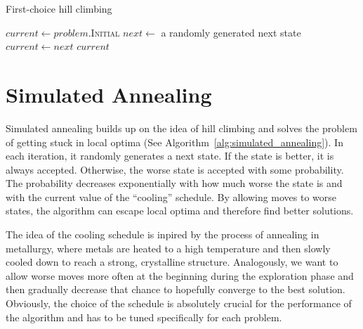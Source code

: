 
\begin{algorithm}

\begin{algorithmic}
\caption{First-choice hill climbing} \label{alg:first_choice_hill_climbing}
\State $current \gets problem$.I\textsc{nitial}
    \State $next \gets$ a randomly generated next state
        \State $current \gets next$
    \EndIf
\EndFor
\State \Return $current$
\EndFunction
\end{algorithmic}
\end{algorithm}

\section{Simulated Annealing} \label{sec:simulated_annealing}

Simulated annealing \cite{russell2020artificial, luke2013essentials} builds up on the idea of hill climbing and solves the problem of getting stuck in local optima (See Algorithm~\ref{alg:simulated_annealing}). In each iteration, it randomly generates a next state. If the state is better, it is always accepted. Otherwise, the worse state is accepted with some probability. The probability decreases exponentially with how much worse the state is and with the current value of the ``cooling'' schedule. By allowing moves to worse states, the algorithm can escape local optima and therefore find better solutions.

The idea of the cooling schedule is inpired by the process of annealing in metallurgy, where metals are heated to a high temperature and then slowly cooled down to reach a strong, crystalline structure. Analogously, we want to allow worse moves more often at the beginning during the exploration phase and then gradually decrease that chance to hopefully converge to the best solution. Obviously, the choice of the schedule is absolutely crucial for the performance of the algorithm and has to be tuned specifically for each problem.


